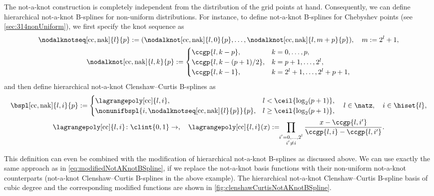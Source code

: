 The not-a-knot construction is completely independent from the
distribution of the grid points at hand.
Consequently, we can define hierarchical not-a-knot B-splines
for non-uniform distributions.
For instance, to define not-a-knot B-splines for
Chebyshev points (see \cref{sec:314nonUniform}),
we first specify the knot sequence as
\begin{subequations}
  \begin{gather}
    \nodalknotseq[\cc,\nak]{l}{p}
    := (\nodalknot[\cc,\nak]{l,0}{p}, \dotsc,
    \nodalknot[\cc,\nak]{l,m+p}{p}),\quad
    m := 2^l + 1,\\
    \nodalknot[\cc,\nak]{l,k}{p}
    :=
    \begin{cases}
      \ccgp{l,k-p},&
      k = 0, \dotsc, p,\\
      \ccgp{l,k-(p+1)/2},&
      k = p + 1, \dotsc, 2^l,\\
      \ccgp{l,k-1},&
      k = 2^l + 1, \dotsc, 2^l + p + 1,
    \end{cases}
  \end{gather}
\end{subequations}
and then define hierarchical not-a-knot Clenshaw--Curtis B-splines as
\begin{subequations}
  \begin{gather}
    \bspl[\cc,\nak]{l,i}{p}
    :=
    \begin{cases}
      \lagrangepoly[\cc]{l,i},&
      l < \ceil{\log_2(p+1)},\\
      \nonunifbspl{i,\nodalknotseq[\cc,\nak]{l}{p}}{p},&
      l \ge \ceil{\log_2(p+1)},
    \end{cases}\quad
    l \in \natz,\quad
    i \in \hiset{l},\\
    \lagrangepoly[\cc]{l,i}\colon \clint{0, 1} \to \real,\quad
    \lagrangepoly[\cc]{l,i}(x)
    := \!\!\prod_{\substack{i'=0,\dotsc,2^l\\i'\not=i}}
    \frac{x - \ccgp{l,i'}}%
    {\ccgp{l,i} - \ccgp{l,i'}}.
  \end{gather}
\end{subequations}

This definition can even be combined with the modification
of hierarchical not-a-knot B-splines as discussed above.
We can use exactly the same approach as in
\eqref{eq:modifiedNotAKnotBSpline}, if we replace the
not-a-knot basis functions with their non-uniform not-a-knot counterparts
(not-a-knot Clenshaw--Curtis B-splines in the above example).
The hierarchical not-a-knot Clenshaw--Curtis B-spline basis of
cubic degree and the corresponding modified functions are shown in
\cref{fig:clenshawCurtisNotAKnotBSpline}.

